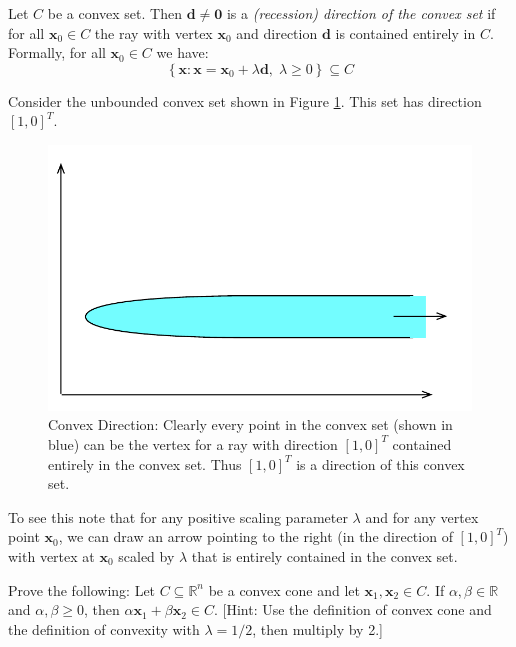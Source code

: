 \begin{definition} Let $C$ be a convex set. Then $\mathbf{d}\neq \mathbf{0}$ is a \textit{(recession) direction of the convex set} if for all $\mathbf{x}_0 \in {C}$ the ray with vertex $\mathbf{x}_0$ and direction $\mathbf{d}$ is contained entirely in $C$. Formally, for all $\mathbf{x}_0 \in C$ we have:
\begin{equation}
\left\{\mathbf{x} : \mathbf{x} = \mathbf{x}_0 + \lambda\mathbf{d},\;\lambda \geq 0\right\} \subseteq C
\end{equation}
\end{definition}
\begin{example} Consider the unbounded convex set shown in Figure \ref{fig:ConvexDirectionExample}. This set has direction $[1,0]^T$. 
\begin{figure}[ht]
\centering
\includegraphics[scale=0.5]{ConvexDirection.pdf}
\caption{Convex Direction: Clearly every point in the convex set (shown in blue) can be the vertex for a ray with direction $[1,0]^T$ contained entirely in the convex set. Thus $[1,0]^T$ is a direction of this convex set.}
\label{fig:ConvexDirectionExample}
\end{figure}
To see this note that for any positive scaling parameter $\lambda$ and for any vertex point $\mathbf{x}_0$, we can draw an arrow pointing to the right (in the direction of $[1,0]^T$) with vertex at $\mathbf{x}_0$ scaled by $\lambda$ that is entirely contained in the convex set.
\end{example}

\begin{exercise} Prove the following: Let $C \subseteq \mathbb{R}^n$ be a convex cone and let $\mathbf{x}_1,\mathbf{x}_2 \in C$. If $\alpha, \beta \in \mathbb{R}$ and $\alpha,\beta \geq 0$, then $\alpha\mathbf{x}_1 + \beta\mathbf{x}_2 \in C$. [Hint: Use the definition of convex cone and the definition of convexity with $\lambda = 1/2$, then multiply by 2.] 
\label{exer:ConvexCone1}
\end{exercise}

